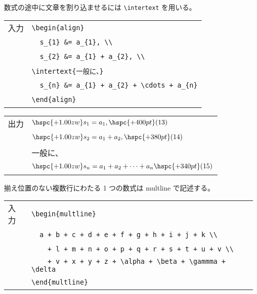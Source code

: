 数式の途中に文章を割り込ませるには \verb`\intertext` を用いる。
\begin{longtable}[l]{@{}l|l@{}}
  入力 & \verb`\begin{align}`                             \\
  \    & \verb`  s_{1} &= a_{1}, \\`                      \\
  \    & \verb`  s_{2} &= a_{1} + a_{2}, \\`              \\
  \    & \verb`\intertext{一般に、}`                      \\
  \    & \verb`  s_{n} &= a_{1} + a_{2} + \cdots + a_{n}` \\
  \    & \verb`\end{align}`                               \\
\end{longtable}
\begin{longtable}[l]{@{}l|l@{}}
  出力 & $\hspc{+1.00zw}s_{1} = a_{1},\hspc{+400pt} \text{(13)}$                          \\
  \    & $\hspc{+1.00zw}s_{2} = a_{1} + a_{2},\hspc{+380pt} \text{(14)}$                  \\
  \    & 一般に、                                                                         \\
  \    & $\hspc{+1.00zw}s_{n} = a_{1} + a_{2} + \cdots + a_{n} \hspc{+340pt} \text{(15)}$ \\
\end{longtable}
揃え位置のない複数行にわたる 1 つの数式は multline で記述する。
\begin{longtable}[l]{@{}l|l@{}}
  入力 & \verb`\begin{multline}`                                        \\
  \    & \verb`  a + b + c + d + e + f + g + h + i + j + k \\`          \\
  \    & \verb`    + l + m + n + o + p + q + r + s + t + u + v \\`      \\
  \    & \verb`    + v + x + y + z + \alpha + \beta + \gammma + \delta` \\
  \    & \verb`\end{multline}`                                          \\
\end{longtable}
